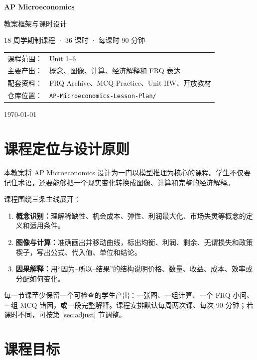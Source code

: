\documentclass[11pt,a4paper]{ctexart}
\newcommand{\resource}[1]{\texttt{\small #1}}
\begin{document}
\begin{titlepage}
\centering
\vspace*{2cm}
{\Huge\bfseries AP Microeconomics\par}
\vspace{0.5cm}
{\LARGE 教案框架与课时设计\par}
\vspace{1.5cm}
{\large 18 周学期制课程 · 36 课时 · 每课时 90 分钟\par}
\vfill
\begin{tabular}{ll}
课程范围：& Unit 1--6\\
主要产出：& 概念、图像、计算、经济解释和 FRQ 表达\\
配套资料：& FRQ Archive、MCQ Practice、Unit HW、开放教材\\
仓库位置：& \resource{AP-Microeconomics-Lesson-Plan/}
\end{tabular}
\vfill
{\large \today\par}
\end{titlepage}

\tableofcontents
\newpage

\section{课程定位与设计原则}

本教案将 AP Microeconomics 设计为一门以模型推理为核心的课程。学生不仅要记住术语，还要能够把一个现实变化转换成图像、计算和完整的经济解释。

课程围绕三条主线展开：

\begin{enumerate}[leftmargin=2em]
  \item \textbf{概念识别：}理解稀缺性、机会成本、弹性、利润最大化、市场失灵等概念的定义和适用条件。
  \item \textbf{图像与计算：}准确画出并移动曲线，标出均衡、利润、剩余、无谓损失和政策楔子，写出公式、代入值、单位和结论。
  \item \textbf{因果解释：}用“因为--所以--结果”的结构说明价格、数量、收益、成本、效率或分配如何变化。
\end{enumerate}

每一节课至少保留一个可检查的学生产出：一张图、一组计算、一个 FRQ 小问、一组 MCQ 错因，或一段完整解释。课程安排默认每周两次课、每次 90 分钟；若课时不同，可按第 \ref{sec:adjust} 节调整。

\section{课程目标}
\end{document}
